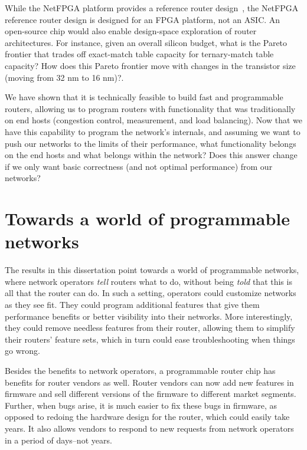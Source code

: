 While the NetFPGA platform provides a reference router design~\cite{netfpga},
the NetFPGA reference router design is designed for an FPGA platform, not an
ASIC. An open-source chip would also enable design-space exploration of router
architectures. For instance, given an overall silicon budget, what is the
Pareto frontier that trades off exact-match table capacity for ternary-match
table capacity? How does this Pareto frontier move with changes in the
transistor size (\eg moving from 32 nm to 16 nm)?.

 We have shown
that it is technically feasible to build fast and programmable routers,
allowing us to program routers with functionality that was traditionally on end
hosts (\eg congestion control, measurement, and load balancing). Now that we
have this capability to program the network's internals, and assuming we want
to push our networks to the limits of their performance, what functionality
belongs on the end hosts and what belongs within the network?  Does this answer
change if we only want basic correctness (and not optimal performance) from our
networks?

\section{Towards a world of programmable networks}

The results in this dissertation point towards a world of programmable
networks, where network operators \textit{tell} routers what to do, without
being \textit{told} that this is all that the router can do. In such a setting,
operators could customize networks as they see fit.  They could program
additional features that give them performance benefits or better visibility
into their networks.  More interestingly, they could remove needless features
from their router, allowing them to simplify their routers' feature sets, which
in turn could ease troubleshooting when things go wrong.

Besides the benefits to network operators, a programmable router chip has
benefits for router vendors as well. Router vendors can now add new features in
firmware and sell different versions of the firmware to different market
segments. Further, when bugs arise, it is much easier to fix these bugs in
firmware, as opposed to redoing the hardware design for the router, which could
easily take years. It also allows vendors to respond to new requests from
network operators in a period of days--not years.

